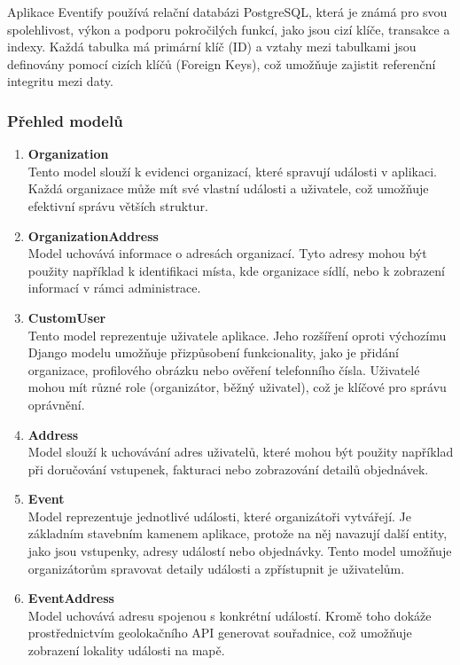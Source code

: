 \documentclass[12pt, a4paper,
twoside,        %
openright
]{report}
\begin{document}
Aplikace Eventify používá relační databázi PostgreSQL, která je známá pro svou spolehlivost, výkon a podporu pokročilých funkcí, jako jsou cizí klíče, transakce a indexy. Každá tabulka má primární klíč (ID) a vztahy mezi tabulkami jsou definovány pomocí cizích klíčů (Foreign Keys), což umožňuje zajistit referenční integritu mezi daty.

\subsubsection{Přehled modelů}

\begin{enumerate}
	\item \textbf{Organization}\\
	Tento model slouží k evidenci organizací, které spravují události v aplikaci. Každá organizace může mít své vlastní události a uživatele, což umožňuje efektivní správu větších struktur.
	
	\item \textbf{OrganizationAddress}\\
	Model uchovává informace o adresách organizací. Tyto adresy mohou být použity například k identifikaci místa, kde organizace sídlí, nebo k zobrazení informací v rámci administrace.
	
	\item \textbf{CustomUser}\\
	Tento model reprezentuje uživatele aplikace. Jeho rozšíření oproti výchozímu Django modelu umožňuje přizpůsobení funkcionality, jako je přidání organizace, profilového obrázku nebo ověření telefonního čísla. Uživatelé mohou mít různé role (organizátor, běžný uživatel), což je klíčové pro správu oprávnění.
	
	\item \textbf{Address}\\
	Model slouží k uchovávání adres uživatelů, které mohou být použity například při doručování vstupenek, fakturaci nebo zobrazování detailů objednávek.
	
	\item \textbf{Event}\\
	Model reprezentuje jednotlivé události, které organizátoři vytvářejí. Je základním stavebním kamenem aplikace, protože na něj navazují další entity, jako jsou vstupenky, adresy událostí nebo objednávky. Tento model umožňuje organizátorům spravovat detaily události a zpřístupnit je uživatelům.
	
	\item \textbf{EventAddress}\\
	Model uchovává adresu spojenou s konkrétní událostí. Kromě toho dokáže prostřednictvím geolokačního API generovat souřadnice, což umožňuje zobrazení lokality události na mapě.
	

\end{enumerate}
\end{document}

